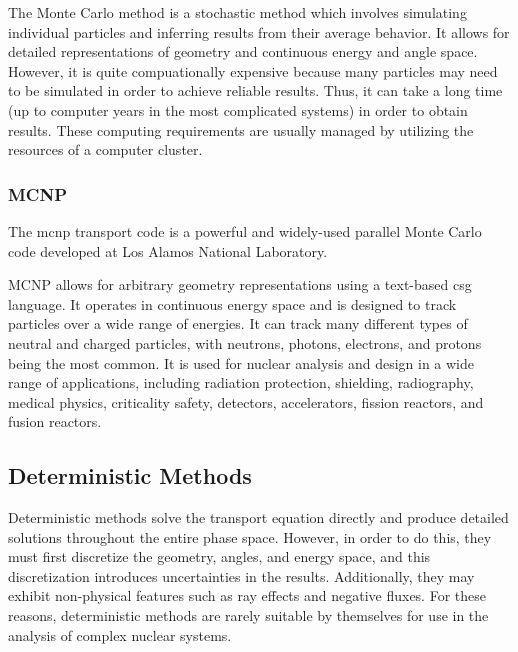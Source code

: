 The Monte Carlo method is a stochastic method which involves simulating individual particles and inferring results from their average behavior.
It allows for detailed representations of geometry and continuous energy and angle space.
However, it is quite compuationally expensive because many particles may need to be simulated in order to achieve reliable results.
Thus, it can take a long time (up to computer years in the most complicated systems) in order to obtain results.
These computing requirements are usually managed by utilizing the resources of a computer cluster.

\subsubsection{MCNP}
\label{sec:bg:rt:mc:mcnp}

The \ac{mcnp} transport code \cite{mcnp620} is a powerful and widely-used parallel Monte Carlo code developed at Los Alamos National Laboratory.

MCNP allows for arbitrary geometry representations using a text-based \ac{csg} language.
It operates in continuous energy space and is designed to track particles over a wide range of energies.
It can track many different types of neutral and charged particles, with neutrons, photons, electrons, and protons being the most common.
It is used for nuclear analysis and design in a wide range of applications, including radiation protection, shielding, radiography, medical physics, criticality safety, detectors, accelerators, fission reactors, and fusion reactors.

\subsection{Deterministic Methods}
\label{sec:bg:rt:determ}

Deterministic methods solve the transport equation directly and produce detailed solutions throughout the entire phase space.
However, in order to do this, they must first discretize the geometry, angles, and energy space, and this discretization introduces uncertainties in the results.
Additionally, they may exhibit non-physical features such as ray effects and negative fluxes.
For these reasons, deterministic methods are rarely suitable by themselves for use in the analysis of complex nuclear systems.

